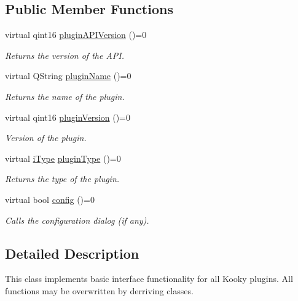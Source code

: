 \subsection*{Public Member Functions}
\begin{DoxyCompactItemize}
\item 
virtual qint16 \hyperlink{classc_interface_a615b50a526c2d4ca73b13f8991371813}{plugin\+A\+P\+I\+Version} ()=0
\begin{DoxyCompactList}\small\item\em Returns the version of the A\+PI. \end{DoxyCompactList}\item 
virtual Q\+String \hyperlink{classc_interface_a17e5a0cf99317ab45f624e68b4a6ecca}{plugin\+Name} ()=0
\begin{DoxyCompactList}\small\item\em Returns the name of the plugin. \end{DoxyCompactList}\item 
virtual qint16 \hyperlink{classc_interface_aadc382036174c2a25bb2c23733830d33}{plugin\+Version} ()=0
\begin{DoxyCompactList}\small\item\em Version of the plugin. \end{DoxyCompactList}\item 
virtual \hyperlink{classc_interface_a41462a3131755963add9ba3026e7d31a}{i\+Type} \hyperlink{classc_interface_af5e408cdaff527a872ce6d02a96301a4}{plugin\+Type} ()=0
\begin{DoxyCompactList}\small\item\em Returns the type of the plugin. \end{DoxyCompactList}\item 
virtual bool \hyperlink{classc_interface_a040fbd069a2c2356faeda1c2d9ac88df}{config} ()=0
\begin{DoxyCompactList}\small\item\em Calls the configuration dialog (if any). \end{DoxyCompactList}\end{DoxyCompactItemize}


\subsection{Detailed Description}
This class implements basic interface functionality for all Kooky plugins. All functions may be overwritten by derriving classes.

